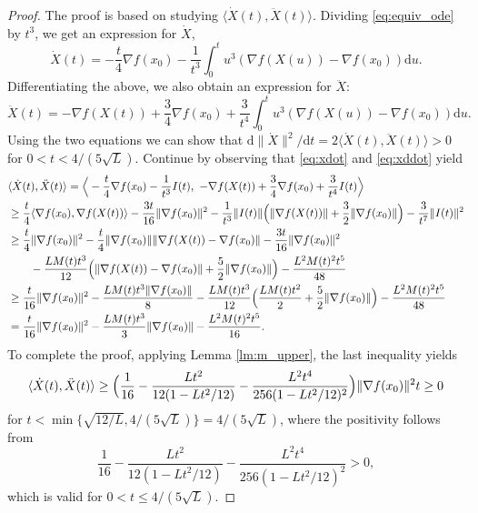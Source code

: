 \documentclass[twoside,11pt]{article}
\newcommand{\norm}[1]{\|#1\|}
\renewcommand{\d}{{\mathrm{d}}}
\begin{document}
\begin{proof}
The proof is based on studying $\langle \dot X(t), \ddot X(t) \rangle$. Dividing \eqref{eq:equiv_ode} by $t^3$, we get an expression for $\dot X$,
\begin{equation}\label{eq:xdot}
\dot X(t) = -\frac{t}{4}\nabla f(x_0) - \frac{1}{t^3}\int^t_0 u^3(\nabla f(X(u)) - \nabla f(x_0)) \d u.
\end{equation}
Differentiating the above, we also obtain an expression for $\ddot X$:
\begin{equation}\label{eq:xddot}
\ddot X(t) = -\nabla f(X(t)) + \frac{3}{4}\nabla f(x_0) + \frac{3}{t^4}\int^t_0 u^3(\nabla f(X(u)) - \nabla f(x_0)) \d u.
\end{equation}
Using the two equations we can show that $\d \norm{\dot X}^2/{\d t} =
2\langle \dot X(t), \ddot X(t) \rangle > 0$ for $0< t <
4/(5\sqrt{L})$. Continue by observing that \eqref{eq:xdot} and
\eqref{eq:xddot} yield
\begin{equation}\nonumber
\begin{aligned}
&\langle \dot X(t), \ddot X(t) \rangle = \Big{\langle} -\frac{t}{4}\nabla f(x_0) - \frac{1}{t^3}I(t),~ -\nabla f(X(t)) + \frac{3}{4}\nabla f(x_0) + \frac{3}{t^4}I(t) \Big{\rangle}\\
&\geq \frac{t}{4}\langle \nabla f(x_0), \nabla f(X(t)) \rangle - \frac{3t}{16}\norm{\nabla f(x_0)}^2 - \frac{1}{t^3}\norm{I(t)}\Big{(}\norm{\nabla f(X(t))} + \frac{3}{2}\norm{\nabla f(x_0)}\Big{)} - \frac{3}{t^7}\norm{I(t)}^2\\
&\geq \frac{t}{4}\norm{\nabla f(x_0)}^2 - \frac{t}{4}\norm{\nabla f(x_0)}\norm{\nabla f(X(t)) - \nabla f(x_0)} - \frac{3t}{16}\norm{\nabla f(x_0)}^2 \\
&\quad\quad - \frac{LM(t)t^3}{12}\Big{(}\norm{\nabla f(X(t)) - \nabla f(x_0)} + \frac{5}{2}\norm{\nabla f(x_0)}\Big{)} - \frac{L^2M(t)^2t^{5}}{48}\\
&\geq 
\frac{t}{16}\norm{\nabla f(x_0)}^2 - \frac{LM(t)t^3\|\nabla f(x_0)\|}{8} - \frac{LM(t)t^3}{12}\Big{(}\frac{LM(t)t^2}{2} + \frac{5}{2}\norm{\nabla f(x_0)}\Big{)} - \frac{L^2M(t)^2t^{5}}{48}\\
&= \frac{t}{16}\norm{\nabla f(x_0)}^2 - \frac{LM(t)t^3}{3}\norm{\nabla f(x_0)}   - \frac{L^2M(t)^2t^5}{16}.
\end{aligned}
\end{equation}
To complete the proof, applying Lemma \ref{lm:m_upper}, the last inequality yields
\begin{equation}\nonumber
\langle\dot X(t), \ddot X(t)\rangle
\geq \Big{(}\frac{1}{16} - \frac{Lt^2}{12(1 - Lt^2/12)} - \frac{L^2t^4}{256(1 - Lt^2/12)^2}\Big{)}\norm{\nabla f(x_0)}^2t \geq 0
\end{equation}
for $t < \min\{\sqrt{12/L}, 4/(5\sqrt{L})\}=4/(5\sqrt{L})$, where the
positivity follows from 
$$\frac{1}{16} - \frac{Lt^2}{12(1 - Lt^2/12)} - \frac{L^2t^4}{256(1 - Lt^2/12)^2} > 0,$$
which is valid for $0 < t \le 4/(5\sqrt{L})$.
\end{proof}
\end{document}
